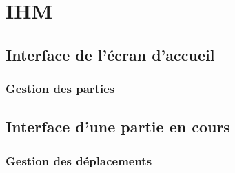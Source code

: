 \chapter{IHM}


\section{Interface de l'écran d'accueil}


\subsection{Gestion des parties}


\section{Interface d'une partie en cours}


\subsection{Gestion des déplacements}

